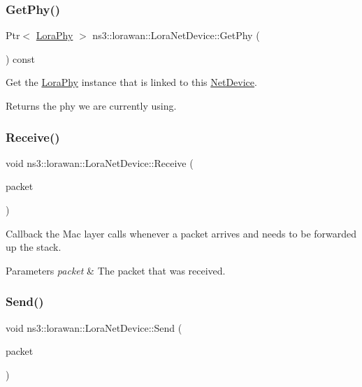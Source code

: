 \subsubsection{\texorpdfstring{Get\+Phy()}{GetPhy()}}
{\footnotesize\ttfamily Ptr$<$ \hyperlink{classns3_1_1lorawan_1_1LoraPhy}{Lora\+Phy} $>$ ns3\+::lorawan\+::\+Lora\+Net\+Device\+::\+Get\+Phy (\begin{DoxyParamCaption}\item[{void}]{ }\end{DoxyParamCaption}) const}

Get the \hyperlink{classns3_1_1lorawan_1_1LoraPhy}{Lora\+Phy} instance that is linked to this \hyperlink{classNetDevice}{Net\+Device}.

\begin{DoxyReturn}{Returns}
the phy we are currently using. 
\end{DoxyReturn}
\mbox{\label{classns3_1_1lorawan_1_1LoraNetDevice_add443b53ca745bff1001c1f3d08aeeef}} 
\subsubsection{\texorpdfstring{Receive()}{Receive()}}
{\footnotesize\ttfamily void ns3\+::lorawan\+::\+Lora\+Net\+Device\+::\+Receive (\begin{DoxyParamCaption}\item[{Ptr$<$ Packet $>$}]{packet }\end{DoxyParamCaption})}

Callback the Mac layer calls whenever a packet arrives and needs to be forwarded up the stack.


\begin{DoxyParams}{Parameters}
{\em packet} & The packet that was received. \\
\hline
\end{DoxyParams}
\mbox{\label{classns3_1_1lorawan_1_1LoraNetDevice_aff1ea5fcd7a14b070db6308aa0860880}} 
\subsubsection{\texorpdfstring{Send()}{Send()}\hspace{0.1cm}{\footnotesize\ttfamily [1/2]}}
{\footnotesize\ttfamily void ns3\+::lorawan\+::\+Lora\+Net\+Device\+::\+Send (\begin{DoxyParamCaption}\item[{Ptr$<$ Packet $>$}]{packet }\end{DoxyParamCaption})}

